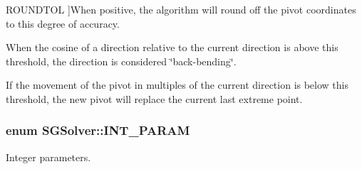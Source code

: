 \begin{Desc}
\begin{description}
{\hypertarget{class_s_g_solver_a8c5a3d3ffb0b8344e24da63ea0b3e791ac2ba4831d6d6282dfab90aa3fdd5a825}{R\+O\+U\+N\+D\+T\+O\+L}\label{class_s_g_solver_a8c5a3d3ffb0b8344e24da63ea0b3e791ac2ba4831d6d6282dfab90aa3fdd5a825}
}]When positive, the algorithm will round off the pivot coordinates to this degree of accuracy. \item[{\em 
\hypertarget{class_s_g_solver_a8c5a3d3ffb0b8344e24da63ea0b3e791a46e8819cb9376cc65094dffdebbe1b86}{B\+A\+C\+K\+B\+E\+N\+D\+I\+N\+G\+T\+O\+L}\label{class_s_g_solver_a8c5a3d3ffb0b8344e24da63ea0b3e791a46e8819cb9376cc65094dffdebbe1b86}
}]When the cosine of a direction relative to the current direction is above this threshold, the direction is considered \char`\"{}back-\/bending\char`\"{}. \item[{\em 
\hypertarget{class_s_g_solver_a8c5a3d3ffb0b8344e24da63ea0b3e791a1be0b2f10efa1591ab0c08b53b23df72}{M\+O\+V\+E\+M\+E\+N\+T\+T\+O\+L}\label{class_s_g_solver_a8c5a3d3ffb0b8344e24da63ea0b3e791a1be0b2f10efa1591ab0c08b53b23df72}
}]If the movement of the pivot in multiples of the current direction is below this threshold, the new pivot will replace the current last extreme point. \end{description}
\end{Desc}
\hypertarget{class_s_g_solver_a75381212963ce8fdcedd23bcff09d1fb}{
\subsubsection[{I\+N\+T\+\_\+\+P\+A\+R\+A\+M}]{\setlength{\rightskip}{0pt plus 5cm}enum {\bf S\+G\+Solver\+::\+I\+N\+T\+\_\+\+P\+A\+R\+A\+M}}}\label{class_s_g_solver_a75381212963ce8fdcedd23bcff09d1fb}


Integer parameters. 

